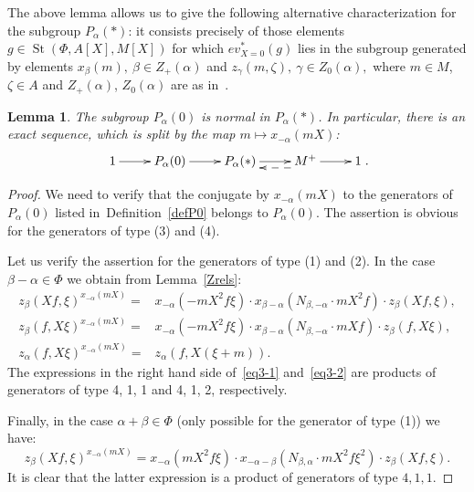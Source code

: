 \documentclass[oneside, 8pt]{amsart}
\newtheorem{lemma}{Lemma}
\theoremstyle{remark}
\theoremstyle{definition}
\DeclareMathOperator{\St}{St}
\numberwithin{equation}{section}
\begin{document}
The above lemma allows us to give the following alternative characterization for the subgroup $P_\alpha(*)$:
 it consists precisely of those elements $g \in \St(\Phi, A[X], M[X])$ for which $ev_{X=0}^*(g)$ lies in the subgroup generated by
 elements $x_{\beta}(m),\ \beta \in Z_+(\alpha)$ and $z_{\gamma}(m, \zeta),\ \gamma \in Z_0(\alpha),$ where $m \in M$, $\zeta \in A$ 
 and $Z_+(\alpha)$, $Z_0(\alpha)$ are as in~\cite[Proposition~5.7]{St71}.
   
\begin{lemma}\label{P0_normal} The subgroup $P_\alpha(0)$ is normal in $P_\alpha(*)$. In particular, there is an exact sequence, which is split by the map $m \mapsto x_{-\alpha}(mX)$:
\[\xymatrix{1 \ar[r] & P_\alpha(0) \ar[r] & P_\alpha(*) \ar[r] & M^+ \ar@<5pt>@{-->}[l] \ar[r] & 1}.\]
\end{lemma}
\begin{proof} We need to verify that the conjugate by $x_{-\alpha}(mX)$ to the generators of $P_\alpha(0)$ listed in~Definition~\ref{defP0} belongs to $P_\alpha(0)$.
The assertion is obvious for the generators of type (3) and (4).

Let us verify the assertion for the generators of type (1) and (2). In the case $\beta - \alpha \in \Phi$ we obtain from Lemma~\ref{Zrels}:
\begin{align} z_{\beta}(Xf, \xi) ^ {x_{-\alpha}(mX)} = & x_{-\alpha} (- mX^2f\xi) \cdot x_{\beta-\alpha} (N_{\beta, -\alpha}\cdot mX^2f) \cdot z_{\beta}(Xf, \xi), \label{eq3-1} \\
  z_{\beta}(f, X\xi) ^ {x_{-\alpha}(mX)} = & x_{-\alpha} (- mX^2f\xi ) \cdot x_{\beta-\alpha} (N_{\beta, -\alpha}\cdot mXf) \cdot z_{\beta}(f, X\xi), \nonumber \\
  z_{\alpha}(f, X\xi) ^ {x_{-\alpha}(mX)} = & z_{\alpha}(f, X(\xi + m)). \nonumber \end{align}
The expressions in the right hand side of~\eqref{eq3-1} and~\eqref{eq3-2} are products of generators of type 4, 1, 1 and 4, 1, 2, respectively.  

Finally, in the case $\alpha + \beta \in \Phi$ (only possible for the generator of type (1)) we have:
\begin{equation} \label{eq3-2} z_{\beta}(Xf, \xi) ^ {x_{-\alpha}(mX)} = x_{-\alpha} (mX^2f\xi ) \cdot x_{-\alpha-\beta} (N_{\beta,\alpha}\cdot mX^2f\xi^2) \cdot z_{\beta}(Xf, \xi). \end{equation}
It is clear that the latter expression is a product of generators of type $4, 1, 1$.
\end{proof}
\end{document}
